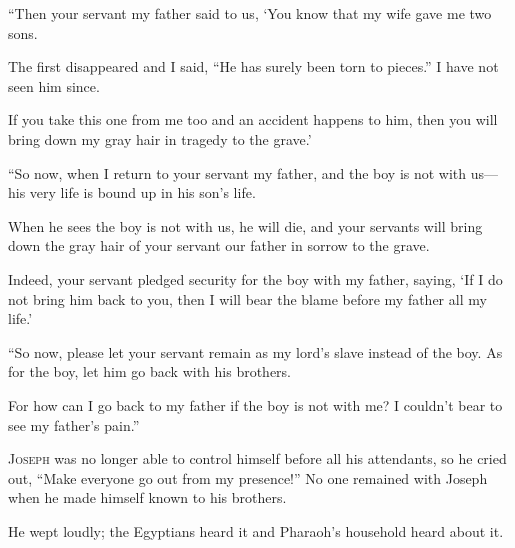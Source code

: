 \begin{scripture}
 ``Then your servant my father said to us, `You know that my wife gave me two sons.
 The first disappeared and I said, ``He has surely been torn to pieces.'' I have not seen him since.
 If you take this one from me too and an accident happens to him, then you will bring down my gray hair in tragedy to the grave.'
\everypar{}

 ``So now, when I return to your servant my father, and the boy is not with us---his very life is bound up in his son's life.
 When he sees the boy is not with us, he will die, and your servants will bring down the gray hair of your servant our father in sorrow to the grave.
 Indeed, your servant pledged security for the boy with my father, saying, `If I do not bring him back to you, then I will bear the blame before my father all my life.'
\everypar{}

 ``So now, please let your servant remain as my lord's slave instead of the boy. As for the boy, let him go back with his brothers.
 For how can I go back to my father if the boy is not with me? I couldn't bear to see my father's pain.''

 \allowchapbreak\hypertarget{ch-genesis-45}{}\lettrine[lines=5]{\color{pentateuch}J}{\textsc{oseph}} was no longer able to control himself before all his attendants, so he cried out, ``Make everyone go out from my presence!'' No one remained with Joseph when he made himself known to his brothers.\everypar{}
 He wept loudly; the Egyptians heard it and Pharaoh's household heard about it.
\everypar{}


\end{scripture}
